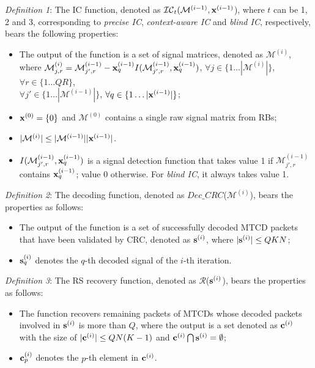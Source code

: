 \documentclass[a4paper]{IEEEtran}
\begin{document}
\textit{Definition 1}: 
The IC function, denoted as $\mathcal{IC}_{t}(\mathcal{M}^{(i-1)},\bold{x}^{(i-1)}$), where $t$ can be 1, 2 and 3, corresponding to \textit{precise IC}, \textit{context-aware IC} and \textit{blind IC}, respectively, bears the following properties:
\begin{itemize}
\item The output of the function is a set of signal matrices, denoted as $\mathcal{M}^{(i)}$, where $\mathcal{M}^{(i)}_{j,r}=\mathcal{M}^{(i-1)}_{j',r}-\bold{x}^{(i-1)}_q I(\mathcal{M}^{(i-1)}_{j',r}, \bold{x}^{(i-1)}_q)$, $\forall j \in \{1\dots|\mathcal{M}^{(i)}|\}$, $\forall r \in \{1\dots QR\}$, \\ $\forall j' \in \{1\dots|\mathcal{M}^{(i-1)}|\}$, $\forall q \in \{1\dots|\bold{x}^{(i-1)}|\}$;
\item $\bold{x}^{(0)} = \left\{0\right\}$ and $\mathcal{M}^{(0)}$ contains a single raw signal matrix from RBs;
\item $|\mathcal{M}^{(i)}| \leq |\mathcal{M}^{(i-1)}| |\bold{x}^{(i-1)}|$.
\item $I(\mathcal{M}^{(i-1)}_{j',r}, \bold{x}^{(i-1)}_q)$ is a signal detection function that takes value 1 if $\mathcal{M}^{(i-1)}_{j',r}$ contains $\bold{x}^{(i-1)}_q$; value 0 otherwise. For \textit{blind IC}, it always takes value 1.
\end{itemize}

\textit{Definition 2}: The decoding function, denoted as $Dec\_CRC$($\mathcal{M}^{(i)}$), bears the properties as follows:
\begin{itemize}
\item The output of the function is a set of successfully decoded MTCD packets that have been validated by CRC, denoted as $\bold{s}^{(i)}$, where $|\bold{s}^{(i)}| \leq QKN$;
\item $\bold{s}^{(i)}_{q}$ denotes the $q$-th decoded signal of the $i$-th iteration.
\end{itemize}

\textit{Definition 3}: The RS recovery function, denoted as $\mathcal{R}$($\bold{s}^{(i)}$), bears the properties as follows:
\begin{itemize}
\item The function recovers remaining packets of MTCDs whose decoded packets involved in $\bold{s}^{(i)}$ is more than $Q$, where the output is a set denoted as $\bold{c}^{(i)}$ with the size of $|\bold{c}^{(i)}| \leq QN(K-1)$ and  $\bold{c}^{(i)} \bigcap \bold{s}^{(i)} = \emptyset$;
\item $\bold{c}^{(i)}_{p}$ denotes the $p$-th element in $\bold{c}^{(i)}$.
\end{itemize}
\end{document}
